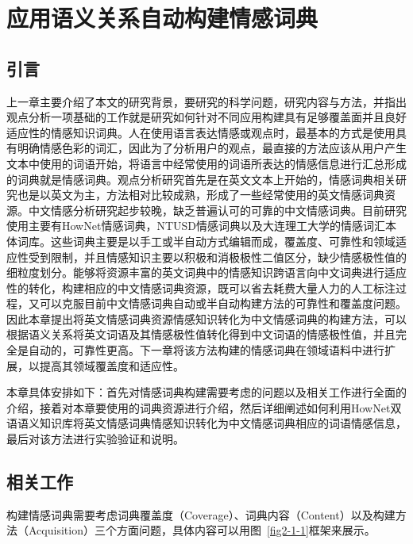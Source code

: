 \chapter{应用语义关系自动构建情感词典}
\label{ch2}

\section{引言}
\label{ch2:intro}
上一章主要介绍了本文的研究背景，要研究的科学问题，研究内容与方法，并指出观点分析一项基础的工作就是研究如何针对不同应用构建具有足够覆盖面并且良好适应性的情感知识词典。人在使用语言表达情感或观点时，最基本的方式是使用具有明确情感色彩的词汇，因此为了分析用户的观点，最直接的方法应该从用户产生文本中使用的词语开始，将语言中经常使用的词语所表达的情感信息进行汇总形成的词典就是情感词典。观点分析研究首先是在英文文本上开始的，情感词典相关研究也是以英文为主，方法相对比较成熟，形成了一些经常使用的英文情感词典资源。中文情感分析研究起步较晚，缺乏普遍认可的可靠的中文情感词典。目前研究使用主要有HowNet情感词典，NTUSD情感词典以及大连理工大学的情感词汇本体词库。这些词典主要是以手工或半自动方式编辑而成，覆盖度、可靠性和领域适应性受到限制，并且情感知识主要以积极和消极极性二值区分，缺少情感极性值的细粒度划分。能够将资源丰富的英文词典中的情感知识跨语言向中文词典进行适应性的转化，构建相应的中文情感词典资源，既可以省去耗费大量人力的人工标注过程，又可以克服目前中文情感词典自动或半自动构建方法的可靠性和覆盖度问题。
因此本章提出将英文情感词典资源情感知识转化为中文情感词典的构建方法，可以根据语义关系将英文词语及其情感极性值转化得到中文词语的情感极性值，并且完全是自动的，可靠性更高。下一章将该方法构建的情感词典在领域语料中进行扩展，以提高其领域覆盖度和适应性。

本章具体安排如下：首先对情感词典构建需要考虑的问题以及相关工作进行全面的介绍，接着对本章要使用的词典资源进行介绍，然后详细阐述如何利用HowNet双语语义知识库将英文情感词典情感知识转化为中文情感词典相应的词语情感信息，最后对该方法进行实验验证和说明。

\section{相关工作}
构建情感词典需要考虑词典覆盖度（Coverage）、词典内容（Content）以及构建方法（Acquisition）三个方面问题，具体内容可以用图~\ref{fig2-1-1}框架来展示。


